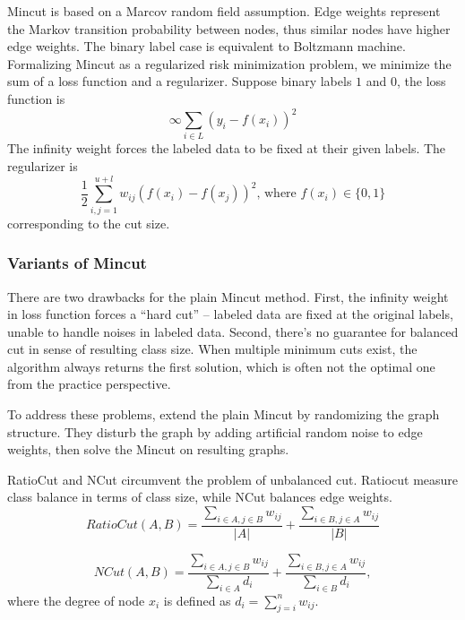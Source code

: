 Mincut is based on a Marcov random field
assumption. Edge weights represent the Markov transition probability between
nodes, thus similar nodes have higher edge weights. The binary label case is
equivalent to Boltzmann machine. Formalizing Mincut as a regularized risk
minimization problem, we minimize the sum of a loss function and a regularizer.
Suppose binary labels $1$ and $0$, the loss function is \[ \infty  \sum_{i\in
L} (y_i - f(x_i))^2\]
The infinity weight forces the labeled data to be fixed at their given labels.
The regularizer is 
\begin{equation}\label{eq:mincut}
    \frac{1}{2}\sum_{i,j=1}^{u+l}w_{ij}(f(x_i)-f(x_j))^2 \mbox{, where
    }f(x_i)\in\{0,1\}\end{equation}
    corresponding to the cut size. 


\subsubsection*{Variants of Mincut}
    There are two drawbacks for the plain Mincut method.
    First, the infinity weight in loss function forces a ``hard cut'' -- labeled
    data are fixed at the original labels, unable to handle noises in labeled
    data.  
    Second, there's no guarantee for balanced cut in sense of resulting class
    size. When multiple minimum cuts exist, the algorithm always returns the
    first solution,
    which is often not the
    optimal one from the practice perspective. 

    To address these problems, \cite{blum2} extend the plain
    Mincut by randomizing the graph structure. They
    disturb the graph by adding artificial random noise to edge weights, then
    solve the Mincut on resulting graphs. 

    RatioCut \cite{ratiocut} and NCut \cite{shi}
    circumvent the problem of unbalanced cut. Ratiocut measure class balance in
    terms of class size, while NCut balances edge weights.
    \begin{equation}\label{eq:ratiocut}
        RatioCut(A, B) =  \frac{ \sum_{i \in A, j \in B} w_{ij}}{ |A|} +
        \frac{ \sum_{i \in B, j \in A} w_{ij}}{ |B|}
    \end{equation}

    \begin{equation}\label{eq:ncut}
        NCut(A, B) =  \frac{ \sum_{i \in A, j \in B} w_{ij}}{ \sum_{i \in
        A} d_i} + \frac{ \sum_{i \in B, j \in A} w_{ij}}{\sum_{i \in B} d_i},
    \end{equation}
    where the degree of node $x_i$ is defined as  $d_i =
    \sum_{j=i}^{n}w_{ij}$.



